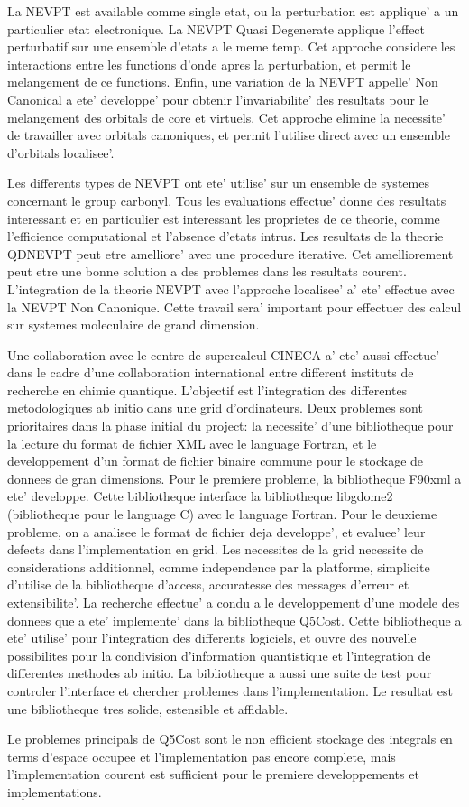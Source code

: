 \documentclass[a4paper,11pt,twoside]{book}
\begin{document}
La NEVPT est available comme single etat, ou la perturbation est applique' a
un particulier etat electronique. La NEVPT Quasi Degenerate applique
l'effect perturbatif sur une ensemble d'etats a le meme temp. Cet approche
considere les interactions entre les functions d'onde apres la perturbation,
et permit le melangement de ce functions.
Enfin, une variation de la NEVPT appelle' Non Canonical a ete' developpe'
pour obtenir l'invariabilite' des resultats pour le melangement des orbitals
de core et virtuels. Cet approche elimine la necessite' de travailler avec
orbitals  canoniques, et permit l'utilise direct avec un ensemble d'orbitals
localisee'.

Les differents types de NEVPT ont ete' utilise' sur un ensemble de systemes
concernant le group carbonyl. Tous les evaluations effectue' donne des
resultats interessant et en particulier est interessant les proprietes de ce
theorie, comme l'efficience computational et l'absence d'etats intrus.
Les resultats de la theorie QDNEVPT peut etre amelliore' avec une procedure
iterative. Cet amelliorement peut etre une bonne solution a des problemes
dans les resultats courent.
L'integration de la theorie NEVPT avec l'approche localisee' a' ete'
effectue avec la NEVPT Non Canonique. Cette travail sera' important pour
effectuer des calcul sur systemes moleculaire de grand dimension.

Une collaboration avec le centre de supercalcul CINECA a' ete' aussi
effectue' dans le cadre d'une collaboration international entre different
instituts de recherche en chimie quantique. L'objectif est l'integration des 
differentes metodologiques ab initio dans une grid d'ordinateurs.
Deux problemes sont prioritaires dans la phase initial du project: la
necessite' d'une bibliotheque pour la lecture du format de fichier XML avec
le language Fortran, et le developpement d'un format de fichier binaire
commune pour le stockage de donnees de gran dimensions.
Pour le premiere probleme, la bibliotheque F90xml a ete' developpe. Cette
bibliotheque interface la bibliotheque libgdome2 (bibliotheque pour le
language C) avec le language Fortran. 
Pour le deuxieme probleme, on a analisee le format de fichier deja
developpe', et evaluee' leur defects dans l'implementation en grid. Les
necessites de la grid necessite de considerations additionnel, comme
independence par la platforme, simplicite d'utilise de la bibliotheque
d'access, accuratesse des messages d'erreur et extensibilite'.
La recherche effectue' a condu a le developpement d'une modele des donnees
que a ete' implemente' dans la bibliotheque Q5Cost. Cette bibliotheque
a ete' utilise' pour l'integration des differents logiciels, et ouvre
des nouvelle possibilites pour la condivision d'information quantistique et
l'integration de differentes methodes ab initio.
La bibliotheque a aussi une suite de test pour controler l'interface et
chercher problemes dans l'implementation. 
Le resultat est une bibliotheque tres solide, estensible et affidable.

Le problemes principals de Q5Cost sont le non efficient stockage des integrals en terms
d'espace occupee et l'implementation pas encore complete, mais l'implementation
courent est sufficient pour le premiere developpements et implementations.
\end{document}
